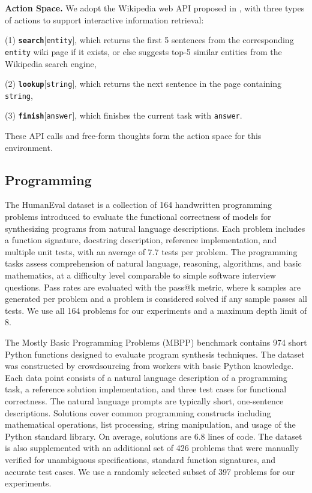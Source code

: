 \documentclass{article} \usepackage{iclr2024_conference,times}
\begin{document}
\textbf{Action Space.} We adopt the Wikipedia web API proposed in \citet{yao2023react}, with three types of actions to support interactive information retrieval: 

(1) \textbf{\texttt{search}}[\texttt{entity}], which returns the first 5 sentences from the corresponding \texttt{entity} wiki page if it exists, or else suggests top-5 similar entities from the Wikipedia search engine, 

(2) \textbf{\texttt{lookup}}[\texttt{string}], which returns the next sentence in the page containing \texttt{string}, 

(3) \textbf{\texttt{finish}}[\texttt{answer}], which finishes the current task with \texttt{answer}.

These API calls and free-form thoughts form the action space for this environment.

\subsection{Programming}

The HumanEval dataset \citep{chen2021evaluating} is a collection of 164 handwritten programming problems introduced to evaluate the functional correctness of models for synthesizing programs from natural language descriptions. Each problem includes a function signature, docstring description, reference implementation, and multiple unit tests, with an average of 7.7 tests per problem. The programming tasks assess comprehension of natural language, reasoning, algorithms, and basic mathematics, at a difficulty level comparable to simple software interview questions. Pass rates are evaluated with the pass@k metric, where k samples are generated per problem and a problem is considered solved if any sample passes all tests. We use all 164 problems for our experiments and a maximum depth limit of 8.

The Mostly Basic Programming Problems (MBPP) \cite{austin2021program} benchmark contains 974 short Python functions designed to evaluate program synthesis techniques. The dataset was constructed by crowdsourcing from workers with basic Python knowledge. Each data point consists of a natural language description of a programming task, a reference solution implementation, and three test cases for functional correctness. The natural language prompts are typically short, one-sentence descriptions. Solutions cover common programming constructs including mathematical operations, list processing, string manipulation, and usage of the Python standard library. On average, solutions are 6.8 lines of code. The dataset is also supplemented with an additional set of 426 problems that were manually verified for unambiguous specifications, standard function signatures, and accurate test cases. We use a randomly selected subset of 397 problems for our experiments.
\end{document}
